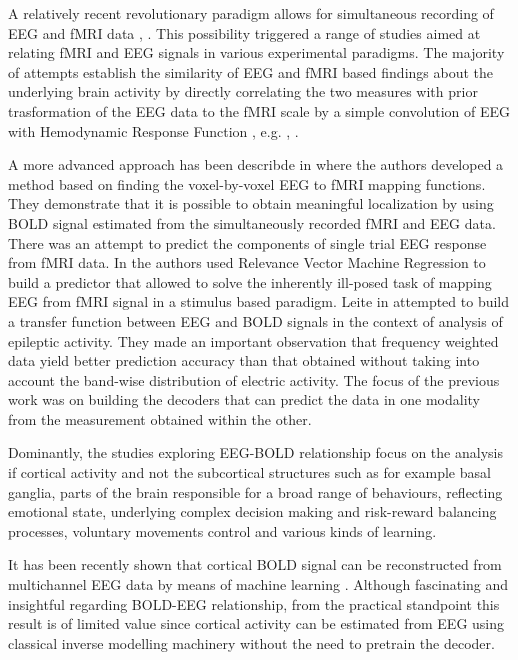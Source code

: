 \documentclass{article}
\begin{document}
A relatively recent  revolutionary paradigm allows for simultaneous recording of EEG and fMRI data \cite{eegfmrirev}, \cite{mbfmri}. This possibility triggered a range of studies aimed at relating fMRI and EEG signals in various experimental paradigms. The majority of attempts establish the similarity of EEG and fMRI based findings about the underlying brain activity by  directly correlating the two measures with prior trasformation of the EEG data to the fMRI scale by a simple convolution of EEG with Hemodynamic Response Function , e.g. \cite{eegfmrialpha}, \cite{concfmrieeg}.  
 
A more advanced approach has been describde in \cite{sato2010} where the authors developed a method based on finding the voxel-by-voxel EEG to fMRI mapping functions. They demonstrate  that it is possible to obtain meaningful localization by using BOLD signal estimated  from the simultaneously recorded  fMRI and EEG data. There was an attempt to predict the components of single trial EEG response from fMRI data. In \cite{martino2011} the authors used Relevance Vector Machine Regression  to build a predictor that allowed to solve the inherently ill-posed task of mapping EEG from fMRI signal in a stimulus based paradigm. Leite in \cite{eegfmriepi} attempted to build a transfer function between EEG and BOLD signals in the context of analysis of epileptic activity. They made an important observation that frequency weighted data yield better prediction accuracy than that obtained without taking into account the band-wise distribution of electric activity. The focus of the previous work was on building the decoders that can predict the data in one modality from the measurement obtained within the other.

Dominantly, the studies exploring EEG-BOLD relationship focus on the analysis if cortical activity and not the subcortical structures such as for example basal ganglia, parts of the brain responsible for a broad range of behaviours, reflecting emotional state, underlying complex decision making and risk-reward balancing processes, voluntary movements control and various kinds of learning. 

It has been recently shown that cortical BOLD signal can be reconstructed from multichannel EEG data by means of machine learning \cite{ml_eeg_fmri}. Although fascinating and insightful regarding BOLD-EEG relationship, from the practical standpoint this result is of limited value since cortical activity can be estimated from EEG using classical inverse modelling machinery \cite{fmri_prior} without the need to pretrain the decoder. 
\end{document}
